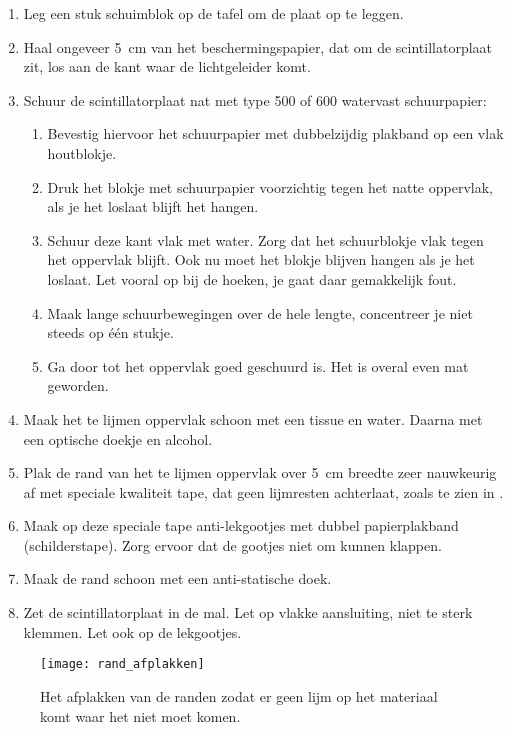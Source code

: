 \begin{enumerate}
    \item Leg een stuk schuimblok op de tafel om de plaat op te leggen.
    \item Haal ongeveer \SI{5}{\centi\meter} van het beschermingspapier,
    dat om de scintillatorplaat zit, los aan de kant waar de lichtgeleider
    komt.
    \item Schuur de scintillatorplaat nat met type 500 of 600 watervast
    schuurpapier:
    \begin{enumerate}
        \item Bevestig hiervoor het schuurpapier met dubbelzijdig
        plakband op een vlak houtblokje.
        \item Druk het blokje met schuurpapier voorzichtig tegen het natte oppervlak,
        als je het loslaat blijft het hangen.
        \item Schuur deze kant vlak met water. Zorg dat het schuurblokje vlak tegen het
        oppervlak blijft. Ook nu moet het blokje blijven hangen als je het loslaat. Let vooral
        op bij de hoeken, je gaat daar gemakkelijk fout.
        \item Maak lange schuurbewegingen over de hele lengte,
        concentreer je niet steeds op één stukje.
        \item Ga door tot het oppervlak goed geschuurd is. Het is overal even mat
        geworden.
    \end{enumerate}
    \item Maak het te lijmen oppervlak schoon met een tissue en water.
    Daarna met een optische doekje en alcohol.
    \item Plak de rand van het te lijmen oppervlak over
    \SI{5}{\centi\meter} breedte zeer nauwkeurig af met speciale
    kwaliteit tape, dat geen lijmresten achterlaat, zoals te zien in
    .
    \item Maak op deze speciale tape anti-lekgootjes met dubbel
    papierplakband (schilderstape). Zorg ervoor dat de gootjes niet om
    kunnen klappen.
    \item Maak de rand schoon met een anti-statische doek.
    \item Zet de scintillatorplaat in de mal. Let op vlakke aansluiting,
    niet te sterk klemmen. Let ook op de lekgootjes.
\end{enumerate}

\begin{figure}
    \centering
    \texttt{[image: rand\_afplakken]}
    \caption{Het afplakken van de randen zodat er geen lijm op het
             materiaal komt waar het niet moet komen.}
    \label{fig:rand_afplakken}
\end{figure}


